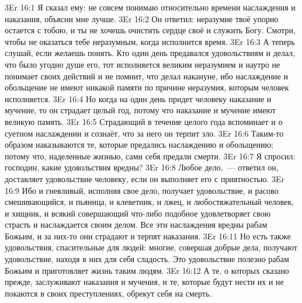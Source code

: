 \vs 3Er 16:1
Я сказал ему: не совсем
понимаю относительно времени наслаждения и наказания, объясни мне лучше.
\vs 3Er 16:2
Он ответил: неразумие твоё
упорно остается с тобою, и ты не хочешь очистить сердце своё и служить Богу.
Смотри, чтобы не оказаться тебе неразумным, когда исполнится время.
\vs 3Er 16:3
А теперь слушай, если
желаешь понять. Кто один день предавался удовольствиям и делал, что было
угодно душе его, тот исполняется великим неразумием и наутро не понимает своих
действий и не помнит, что делал накануне, ибо наслаждение и обольщение не
имеют никакой памяти по причине неразумия, которым человек исполняется.
\vs 3Er 16:4
Но когда на один день
придет человеку наказание и мучение, то он страдает целый год, потому что
наказание и мучение имеют великую память.
\vs 3Er 16:5
Страдающий в течение
целого года вспоминает и о суетном наслаждении и сознаёт, что за него он
терпит зло.
\vs 3Er 16:6
Таким-то образом
наказываются те, которые предались наслаждению и обольщению; потому что,
наделенные жизнью, сами себя предали смерти.
\vs 3Er 16:7
Я спросил: господин, какие
удовольствия вредны?
\vs 3Er 16:8
Любое дело,~--- ответил он,
доставляет удовольствие человеку, если он выполняет его с приятностью.
\vs 3Er 16:9
Ибо и гневливый, исполняя
свое дело, получает удовольствие, и расово смешивающийся, и пьяница, и
клеветник, и лжец, и любостяжательный человек, и хищник, и всякий совершающий
что-либо подобное удовлетворяет свою страсть и наслаждается своим делом. Все
эти наслаждения вредны рабам Божьим, и за них-то они страдают и терпят
наказания.
\vs 3Er 16:11
Но есть также
удовольствия, спасительные для людей: многие, совершая добрые дела, получают
удовольствие, находя в них для себя сладость. Это удовольствие полезно рабам
Божьим и приготовляет жизнь таким людям.
\vs 3Er 16:12
А те, о которых сказано
прежде, заслуживают наказания и мучения, и те, которые будут нести их и не
покаются в своих преступлениях, обрекут себя на смерть.

